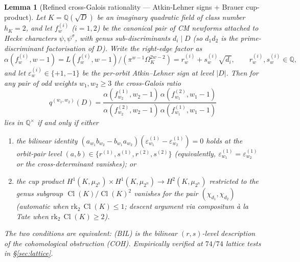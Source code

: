 \documentclass[11pt,a4paper]{amsart}
\theoremstyle{plain}
\newtheorem{lemma}[theorem]{Lemma}
\theoremstyle{definition}
\DeclareMathOperator{\Cl}{Cl}
\newcommand{\Q}{\mathbb{Q}}
\newcommand{\fl}[2]{f_{#1}^{(#2)}}
\newcommand{\qstr}[2]{q^{(#1,#2)}}
\begin{document}
\begin{lemma}[Refined cross-Galois rationality — Atkin-Lehner signs + Brauer cup-product]\label{lem:S2-refined}
Let $K = \Q(\sqrt{D})$ be an imaginary quadratic field of class number
$h_K = 2$, and let $\fl{w}{i}$ ($i = 1, 2$) be the canonical pair of CM
newforms attached to Hecke characters $\psi, \psi^\sigma$, with genus
sub-discriminants $d_i \mid D$ (so $d_1 d_2$ is the
prime-discriminant factorisation of $D$).
Write the right-edge factor as
\[ \alpha(\fl{w}{i}, w-1) = L(\fl{w}{i}, w-1)/
   (\pi^{w-1}\Omega_K^{2w-2}) = r_w^{(i)} + s_w^{(i)}\sqrt{d_i},
   \qquad r_w^{(i)}, s_w^{(i)} \in \Q,
\]
and let $\varepsilon_w^{(i)} \in \{+1, -1\}$ be the per-orbit
Atkin--Lehner sign at level $|D|$.
Then for any pair of odd weights $w_1, w_2 \ge 3$ the cross-Galois ratio
\[ \qstr{w_1}{w_2}(D)
   = \frac{\alpha(\fl{w_2}{1}, w_2-1)\,\alpha(\fl{w_1}{2}, w_1-1)}
          {\alpha(\fl{w_2}{2}, w_2-1)\,\alpha(\fl{w_1}{1}, w_1-1)}
\]
lies in $\Q^{\times}$ if and only if either
\begin{enumerate}
  \item[\textup{(BIL)}] the bilinear identity
    $(a_{w_1} b_{w_2} - b_{w_1} a_{w_2})
     (\varepsilon_{w_1}^{(1)} - \varepsilon_{w_2}^{(1)}) = 0$
    holds at the orbit-pair level $(a, b) \in
    \{r^{(1)}, s^{(1)}, r^{(2)}, s^{(2)}\}$ (equivalently,
    $\varepsilon_{w_1}^{(1)} = \varepsilon_{w_2}^{(1)}$ or the
    cross-determinant vanishes); or
  \item[\textup{(COH)}] the cup product
    $H^1(K, \mu_{2^n}) \times H^1(K, \mu_{2^n}) \to H^2(K, \mu_{2^n})$
    restricted to the genus subgroup $\Cl(K)/\Cl(K)^2$
    vanishes for the pair $(\chi_{d_1}, \chi_{d_2})$ (automatic when
    $\mathrm{rk}_2\,\Cl(K) \le 1$; descent argument via compositum
    \`a la Tate when $\mathrm{rk}_2\,\Cl(K) \ge 2$).
\end{enumerate}
The two conditions are equivalent: \textup{(BIL)} is the bilinear
$(r,s)$-level description of the cohomological obstruction
\textup{(COH)}.  Empirically verified at $74/74$ lattice tests in
\S\ref{sec:lattice}.
\end{lemma}
\end{document}
